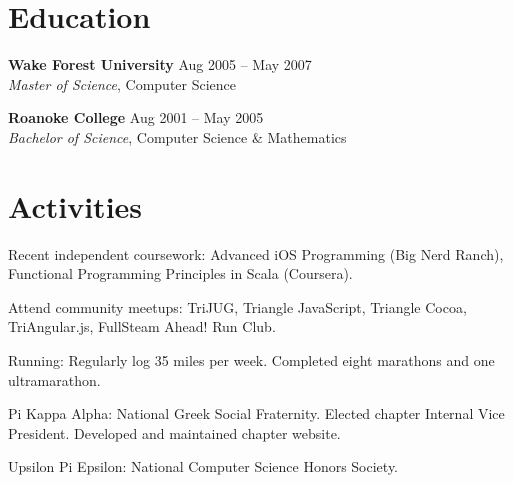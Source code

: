 \documentclass[margin,line]{resume}
\begin{document}
\begin{resume}

  \section{\mysidestyle \textcolor{mySideColor}{Education}}

  \textbf{Wake Forest University}\vspace{2mm} \hfill Aug 2005 -- May 2007\\
  \textsl{Master of Science}, Computer Science\vspace{-1mm}

  \textbf{Roanoke College}\vspace{2mm} \hfill Aug 2001 -- May 2005\\
  \textsl{Bachelor of Science}, Computer Science \& Mathematics\vspace{-1mm}


  \section{\mysidestyle \textcolor{mySideColor}{Activities}}

  Recent independent coursework: Advanced iOS Programming (Big Nerd Ranch),
Functional Programming Principles in Scala (Coursera).

  Attend community meetups: TriJUG, Triangle JavaScript, Triangle Cocoa, TriAngular.js,
FullSteam Ahead! Run Club.

  Running: Regularly log 35 miles per week. Completed eight marathons and one
ultramarathon.\vspace{-2mm}

  Pi Kappa Alpha: National Greek Social Fraternity. Elected chapter
  Internal Vice President. Developed and maintained chapter
  website.\vspace{-2mm}

  Upsilon Pi Epsilon: National Computer Science Honors Society.\vspace{-2mm}

\end{resume}
\end{document}
